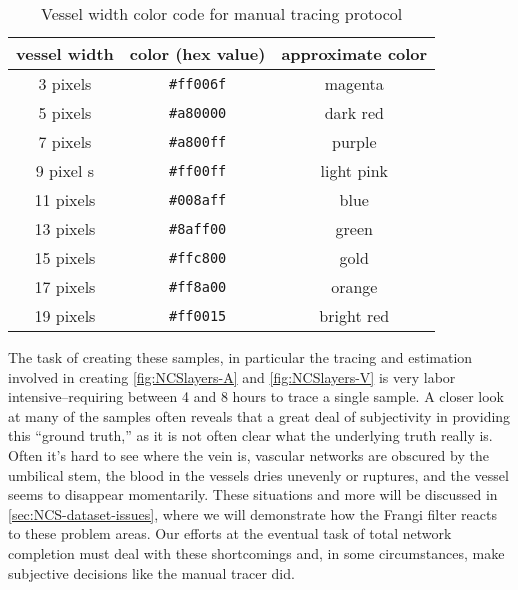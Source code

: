 \begin{table}
    \centering
\begin{tabular}{ccc}
    \hline
    \rule[-1ex]{0pt}{2.5ex}
    vessel width & color (hex value) & approximate color \\
    \hline 
    \rule[-1ex]{0pt}{2.5ex}
    3 pixels &  \texttt{\#ff006f} &   magenta \\                                      
    \rule[-1ex]{0pt}{2.5ex}
    5 pixels & \texttt{\#a80000}  & dark red \\                                      
    \rule[-1ex]{0pt}{2.5ex}
    7 pixels &  \texttt{\#a800ff} & purple \\                                          
    \rule[-1ex]{0pt}{2.5ex}
    9 pixel s&  \texttt{\#ff00ff}  & light pink \\
    \rule[-1ex]{0pt}{2.5ex}
    11 pixels &  \texttt{\#008aff} & blue \\                                          
    \rule[-1ex]{0pt}{2.5ex}
    13 pixels &  \texttt{\#8aff00} &   green \\                                        
    \rule[-1ex]{0pt}{2.5ex}
    15 pixels &  \texttt{\#ffc800} &  gold \\                                    
    \rule[-1ex]{0pt}{2.5ex}
    17 pixels & \texttt{\#ff8a00}  &  orange \\                                         
    \rule[-1ex]{0pt}{2.5ex}
    19 pixels & \texttt{\#ff0015}   &  bright red  \\
    \hline
\end{tabular}
\caption{Vessel width color code for manual tracing protocol}
\label{tab:widthcolors}
\end{table}


The task of creating these samples, in particular the tracing and estimation involved in creating \cref{fig:NCSlayers-A} and \cref{fig:NCSlayers-V} is very labor intensive--requiring between 4 and 8 hours to trace a single sample.
A closer look at many of the samples often reveals that a great deal of subjectivity in providing this ``ground truth,'' as it is not often clear what the underlying truth really is. Often it's hard to see where the vein is, vascular networks are obscured by the umbilical stem, the blood in the vessels dries unevenly or ruptures, and the vessel seems to disappear momentarily. These situations and more will be discussed in \cref{sec:NCS-dataset-issues}, where we will demonstrate how the Frangi filter reacts to these problem areas. Our efforts at the eventual task of total network completion must deal with these shortcomings and, in some circumstances, make subjective decisions like the manual tracer did.


